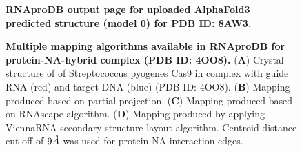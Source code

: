 \begin{center}
    \begin{figure}[H]
        \caption[RNAproDB output page for uploaded AlphaFold3 predicted structure (model 0) for PDB ID: 8AW3]{\textbf{ RNAproDB output page for uploaded AlphaFold3 predicted structure (model 0) for PDB ID: 8AW3.}}
  \label{fig:rnaprodbS2}
\end{figure}
\end{center}
\begin{center}
    \begin{figure}[H]
         \caption[Multiple mapping algorithms available in RNAproDB for protein-NA-hybrid complex (PDB ID: 4OO8)]{\textbf{Multiple mapping algorithms available in RNAproDB for protein-NA-hybrid complex (PDB ID: 4OO8).} ({\bf A}) Crystal structure of of Streptococcus pyogenes Cas9 in complex with guide RNA (red) and target DNA (blue) (PDB ID: 4OO8).  ({\bf B})  Mapping produced based on partial projection. ({\bf C}) Mapping produced based on RNAscape algorithm. ({\bf D}) Mapping produced by applying ViennaRNA secondary structure layout algorithm. Centroid distance cut off of $9 \AA$ was used for protein-NA interaction edges.}
  \label{fig:rnaprodbS3}
\end{figure}
\end{center}
